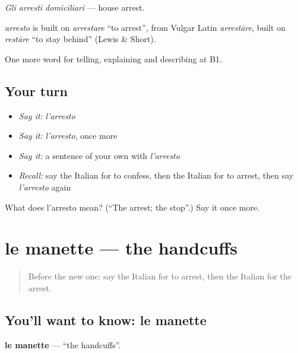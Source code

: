 \emph{Gli arresti domiciliari} — house arrest.

\begin{cousinweb}
\emph{arresto} is built on \emph{arrestare} \textquotedblleft{}to arrest\textquotedblright{}, from Vulgar Latin \emph{arrestāre}, built on \emph{restāre} \textquotedblleft{}to stay behind\textquotedblright{} (Lewis \& Short).
\end{cousinweb}

\begin{grammarlens}[title={What you've built}]
One more word for telling, explaining and describing at B1.
\end{grammarlens}

\subsection*{Your turn}
\begin{itemize}
\raggedright
  \item \emph{Say it:} \emph{l'arresto}
  \item \emph{Say it:} \emph{l'arresto}, once more
  \item \emph{Say it:} a sentence of your own with \emph{l'arresto}
  \item \emph{Recall:} say the Italian for to confess, then the Italian for to arrest, then say \emph{l'arresto} again
\end{itemize}

\begin{tcolorbox}[breakable,colback=teal!4,colframe=teal!35!black,title={Before you move on}]
What does l'arresto mean? (\textquotedblleft{}The arrest; the stop\textquotedblright{}.) Say it once more.
\end{tcolorbox}
\section[le manette]{le manette — the handcuffs}

\label{lesson:IT-C297-manette}



\begin{quote}
Before the new one: say the Italian for to arrest, then the Italian for the arrest.
\end{quote}

\subsection*{You'll want to know: le manette}
\textbf{le manette} — \textquotedblleft{}the handcuffs\textquotedblright{}.

